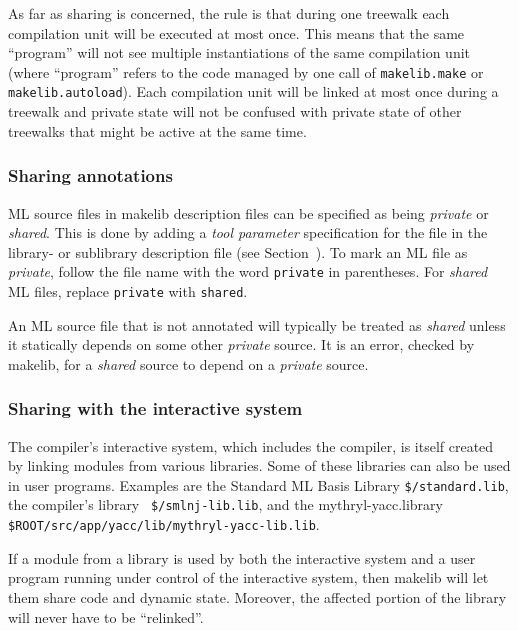 As far as sharing is concerned, the rule is that during one treewalk
each compilation unit will be executed at most once.  This means that
the same ``program'' will not see multiple instantiations of the same
compilation unit (where ``program'' refers to the code managed by one
call of {\tt makelib.make} or {\tt makelib.autoload}).  Each compilation unit
will be linked at most once during a treewalk and private state
will not be confused with private state of other treewalks that might
be active at the same time.


\subsubsection{Sharing annotations}

ML source files in makelib description files can be specified as being {\em
private} or {\em shared}.  This is done by adding a {\em tool
parameter} specification for the file in the library- or sublibrary
description file (see Section~). To mark an ML file
as {\em private}, follow the file name with the word {\tt private} in
parentheses.  For {\em shared} ML files, replace {\tt private} with
{\tt shared}.

An ML source file that is not annotated will typically be treated as
{\em shared} unless it statically depends on some other {\em private}
source.  It is an error, checked by makelib, for a {\em shared} source to
depend on a {\em private} source.

\subsubsection{Sharing with the interactive system}

The compiler's interactive system, which includes the compiler, is itself
created by linking modules from various libraries. Some of these
libraries can also be used in user programs.  Examples are the
Standard ML Basis Library {\tt \$/standard.lib}, the compiler's library {\tt
\$/smlnj-lib.lib}, and the mythryl-yacc.library {\tt \$ROOT/src/app/yacc/lib/mythryl-yacc-lib.lib}.

If a module from a library is used by both the interactive system and
a user program running under control of the interactive system, then
makelib will let them share code and dynamic state.  Moreover, the affected
portion of the library will never have to be ``relinked''.
